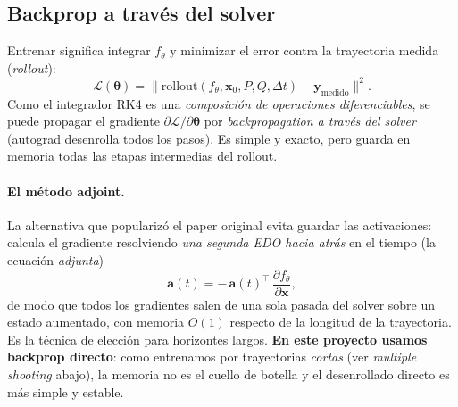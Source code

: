 \documentclass[11pt,a4paper]{article}
\newcommand{\x}{\mathbf{x}}
\newcommand{\thetavec}{\bm{\theta}}
\newcommand{\transp}{^{\top}}
\begin{document}
\subsection{Backprop a través del solver}
Entrenar significa integrar $f_\theta$ y minimizar el error contra la trayectoria medida (\emph{rollout}):
\begin{equation}
  \mathcal{L}(\thetavec)=\big\lVert \mathrm{rollout}(f_\theta,\x_0,P,Q,\Delta t)-\mathbf{y}_{\text{medido}}\big\rVert^2.
\end{equation}
Como el integrador RK4 es una \emph{composición de operaciones diferenciables}, se puede propagar el gradiente $\partial\mathcal{L}/\partial\thetavec$ por \emph{backpropagation a través del solver} (autograd desenrolla todos los pasos). Es simple y exacto, pero guarda en memoria todas las etapas intermedias del rollout.

\paragraph{El método adjoint.} La alternativa que popularizó el paper original \cite{chen2018} evita guardar las activaciones: calcula el gradiente resolviendo \emph{una segunda EDO hacia atrás} en el tiempo (la ecuación \emph{adjunta})
\begin{equation}
  \dot{\mathbf{a}}(t)=-\,\mathbf{a}(t)\transp\,\frac{\partial f_\theta}{\partial \x},
\end{equation}
de modo que todos los gradientes salen de una sola pasada del solver sobre un estado aumentado, con memoria $O(1)$ respecto de la longitud de la trayectoria. Es la técnica de elección para horizontes largos. \textbf{En este proyecto usamos backprop directo}: como entrenamos por trayectorias \emph{cortas} (ver \emph{multiple shooting} abajo), la memoria no es el cuello de botella y el desenrollado directo es más simple y estable.
\end{document}

